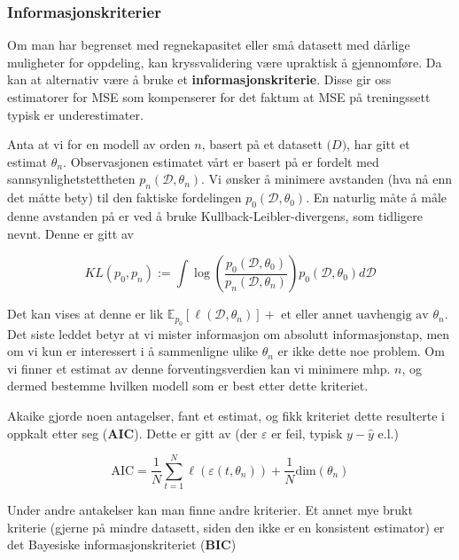 \subsubsection{Informasjonskriterier}
Om man har begrenset med regnekapasitet eller små datasett med dårlige muligheter for oppdeling, kan kryssvalidering være upraktisk å gjennomføre. Da kan at alternativ være å bruke et \textbf{informasjonskriterie}. Disse gir oss estimatorer for MSE som kompenserer for det faktum at MSE på treningssett typisk er underestimater.

Anta at vi for en modell av orden $n$, basert på et datasett $\mathcal(D)$, har gitt et estimat $\theta_n$. Observasjonen estimatet vårt er basert på er fordelt med sannsynlighetstettheten $p_n(\mathcal{D}, \theta_n)$. Vi ønsker å minimere avstanden (hva nå enn det måtte bety) til den faktiske fordelingen $p_0(\mathcal{D}, \theta_0)$. En naturlig måte å måle denne avstanden på er ved å bruke Kullback-Leibler-divergens, som tidligere nevnt. Denne er gitt av

\begin{equation}
	K L\left(p_{0}, p_{n}\right):=\int \log \left(\frac{p_{0}\left({\mathcal{D}}, \theta_{0}\right)}{p_{n}\left({\mathcal{D}}, \theta_{n}\right)}\right) p_{0}\left({\mathcal{D}}, \theta_{0}\right) d {\mathcal{D}}
\end{equation}

Det kan vises at denne er lik $\mathbb{E}_{p_0} [\ell (\mathcal{D}, \theta_n)] + \textrm{ et eller annet uavhengig av } \theta_n$. Det siste leddet betyr at vi mister informasjon om absolutt informasjonstap, men om vi kun er interessert i å sammenligne ulike $\theta_n$ er ikke dette noe problem. Om vi finner et estimat av denne forventingsverdien kan vi minimere mhp. $n$, og dermed bestemme hvilken modell som er best etter dette kriteriet.

Akaike gjorde noen antagelser, fant et estimat, og fikk kriteriet dette resulterte i oppkalt etter seg (\textbf{AIC}). Dette er gitt av (der $\varepsilon$ er feil, typisk $y - \hat{y}$ e.l.)

\begin{equation}
	\textrm{AIC} = \frac{1}{N} \sum_{t = 1}^N \ell (\varepsilon (t, \theta_n)) + \frac{1}{N} \textrm{dim}(\theta_n)
\end{equation}

Under andre antakelser kan man finne andre kriterier. Et annet mye brukt kriterie (gjerne på mindre datasett, siden den ikke er en konsistent estimator) er det Bayesiske informasjonskriteriet (\textbf{BIC})

